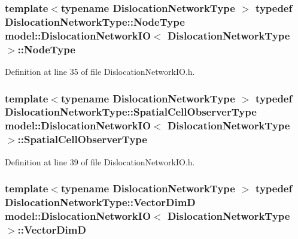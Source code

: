 \subsubsection[{Node\+Type}]{\setlength{\rightskip}{0pt plus 5cm}template$<$typename Dislocation\+Network\+Type $>$ typedef Dislocation\+Network\+Type\+::\+Node\+Type {\bf model\+::\+Dislocation\+Network\+I\+O}$<$ Dislocation\+Network\+Type $>$\+::{\bf Node\+Type}}\label{structmodel_1_1_dislocation_network_i_o_a33463e36c65dfbad3e7f656a83e6ac58}


Definition at line 35 of file Dislocation\+Network\+I\+O.\+h.

\hypertarget{structmodel_1_1_dislocation_network_i_o_aee96cf0b487c398eea34559c3aa873bf}{}
\subsubsection[{Spatial\+Cell\+Observer\+Type}]{\setlength{\rightskip}{0pt plus 5cm}template$<$typename Dislocation\+Network\+Type $>$ typedef Dislocation\+Network\+Type\+::\+Spatial\+Cell\+Observer\+Type {\bf model\+::\+Dislocation\+Network\+I\+O}$<$ Dislocation\+Network\+Type $>$\+::{\bf Spatial\+Cell\+Observer\+Type}}\label{structmodel_1_1_dislocation_network_i_o_aee96cf0b487c398eea34559c3aa873bf}


Definition at line 39 of file Dislocation\+Network\+I\+O.\+h.

\hypertarget{structmodel_1_1_dislocation_network_i_o_aecfb7f1c25d54991dff328deed306f35}{}
\subsubsection[{Vector\+Dim\+D}]{\setlength{\rightskip}{0pt plus 5cm}template$<$typename Dislocation\+Network\+Type $>$ typedef Dislocation\+Network\+Type\+::\+Vector\+Dim\+D {\bf model\+::\+Dislocation\+Network\+I\+O}$<$ Dislocation\+Network\+Type $>$\+::{\bf Vector\+Dim\+D}}\label{structmodel_1_1_dislocation_network_i_o_aecfb7f1c25d54991dff328deed306f35}



